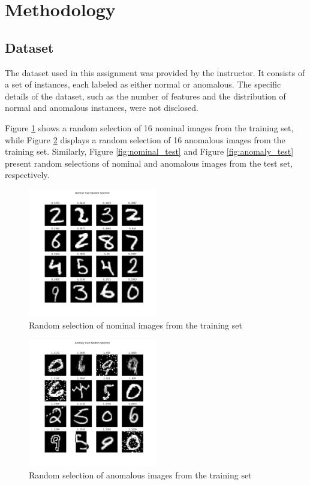 \section{Methodology}
\subsection{Dataset}
The dataset used in this assignment was provided by the instructor. It consists of a set of instances, each labeled as either normal or anomalous. The specific details of the dataset, such as the number of features and the distribution of normal and anomalous instances, were not disclosed.

Figure \ref{fig:nominal_train} shows a random selection of 16 nominal images from the training set, while Figure \ref{fig:anomaly_train} displays a random selection of 16 anomalous images from the training set. Similarly, Figure \ref{fig:nominal_test} and Figure \ref{fig:anomaly_test} present random selections of nominal and anomalous images from the test set, respectively.

\begin{figure}[htbp]
\centering
\includegraphics[width=0.5\textwidth]{resources/images/_nominal_train_random_selection.png}
\caption{Random selection of nominal images from the training set}
\label{fig:nominal_train}
\end{figure}

\begin{figure}[htbp]
\centering
\includegraphics[width=0.5\textwidth]{resources/images/_anomaly_train_random_selection.png}
\caption{Random selection of anomalous images from the training set}
\label{fig:anomaly_train}
\end{figure}

